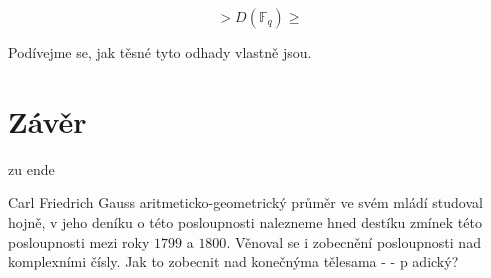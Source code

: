 \documentclass[12pt]{report}
\begin{document}
\begin{dusledek}
$$ > D(\mathbb{F}_q) \geqslant$$
\end{dusledek}

Podívejme se, jak těsné tyto odhady vlastně jsou.





\chapter*{Závěr}
zu ende

Carl Friedrich Gauss aritmeticko-geometrický průměr ve svém mládí studoval hojně, v jeho deníku o této posloupnosti nalezneme hned destíku zmínek této posloupnosti mezi roky $1799$ a $1800$. Věnoval se i zobecnění posloupnosti nad komplexními čísly. Jak to zobecnit nad konečnýma tělesama - - p adický?





\end{document}
